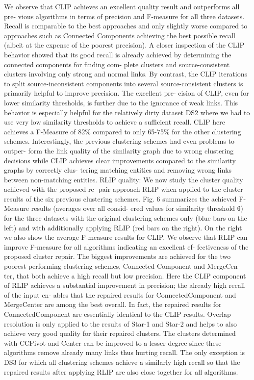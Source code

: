 \documentclass[runningheads]{llncs}
\begin{document}
We observe that CLIP achieves an excellent quality result and outperforms all pre- vious algorithms in terms of precision and F-measure for all three datasets. Recall is comparable to the best approaches and only slightly worse compared to approaches such as Connected Components achieving the best possible recall (albeit at the expense of the poorest precision). A closer inspection of the CLIP behavior showed that its good recall is already achieved by determining the connected components for finding com- plete clusters and source-consistent clusters involving only strong and normal links. By contrast, the CLIP iterations to split source-inconsistent components into several source-consistent clusters is primarily helpful to improve precision. The excellent pre- cision of CLIP, even for lower similarity thresholds, is further due to the ignorance of weak links. This behavior is especially helpful for the relatively dirty dataset DS2 where we had to use very low similarity thresholds to achieve a sufficient recall. CLIP here achieves a F-Measure of 82\% compared to only 65-75\% for the other clustering schemes. Interestingly, the previous clustering schemes had even problems to outper- form the link quality of the similarity graph due to wrong clustering decisions while CLIP achieves clear improvements compared to the similarity graphs by correctly clus- tering matching entities and removing wrong links between non-matching entities.
RLIP quality: We now study the cluster quality achieved with the proposed re- pair approach RLIP when applied to the cluster results of the six previous clustering schemes. Fig. 6 summarizes the achieved F-Measure results (averages over all consid- ered values for similarity threshold θ) for the three datasets with the original clustering schemes only (blue bars on the left) and with additionally applying RLIP (red bars on the right). On the right we also show the average F-measure results for CLIP. We observe that RLIP can improve F-measure for all algorithms indicating an excellent ef- fectiveness of the proposed cluster repair. The biggest improvements are achieved for the two poorest performing clustering schemes, Connected Component and MergeCen- ter, that both achieve a high recall but low precision. Here the CLIP component of RLIP achieves a substantial improvement in precision; the already high recall of the input en- ables that the repaired results for ConnectedComponent and MergeCenter are among the best overall. In fact, the repaired results for ConnectedComponent are essentially identical to the CLIP results. Overlap resolution is only applied to the results of Star-1 and Star-2 and helps to also achieve very good quality for their repaired clusters. The clusters determined with CCPivot and Center can be improved to a lesser degree since these algorithms remove already many links thus hurting recall. The only exception is DS3 for which all clustering schemes achieve a similarly high recall so that the repaired results after applying RLIP are also close together for all algorithms.
\end{document}
